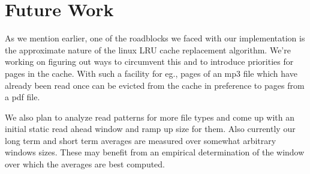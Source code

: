 \documentclass[twocolumn,10pt]{article}
\begin{document}
\section{Future Work}

As we mention earlier, one of the roadblocks we faced with our implementation
is the approximate nature of the linux LRU cache replacement algorithm. We're
working on figuring out ways to circumvent this and to introduce priorities for pages in the cache. With such a facility for eg., pages of an mp3 file which have already been read
once can be evicted from the cache in preference to pages from a pdf file.

We also plan to analyze read patterns for more file types and come up with an initial static read ahead window and ramp up size for them. Also currently our long term and short term averages are measured over somewhat arbitrary windows sizes. These may benefit from an empirical determination of the window over which the averages are best computed.
\end{document}

